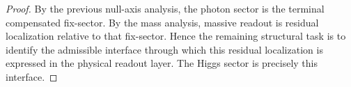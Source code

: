 \begin{proof}
By the previous null-axis analysis, the photon sector is the terminal
compensated fix-sector. By the mass analysis, massive readout is residual
localization relative to that fix-sector. Hence the remaining structural task
is to identify the admissible interface through which this residual
localization is expressed in the physical readout layer. The Higgs sector is
precisely this interface.
\end{proof}

